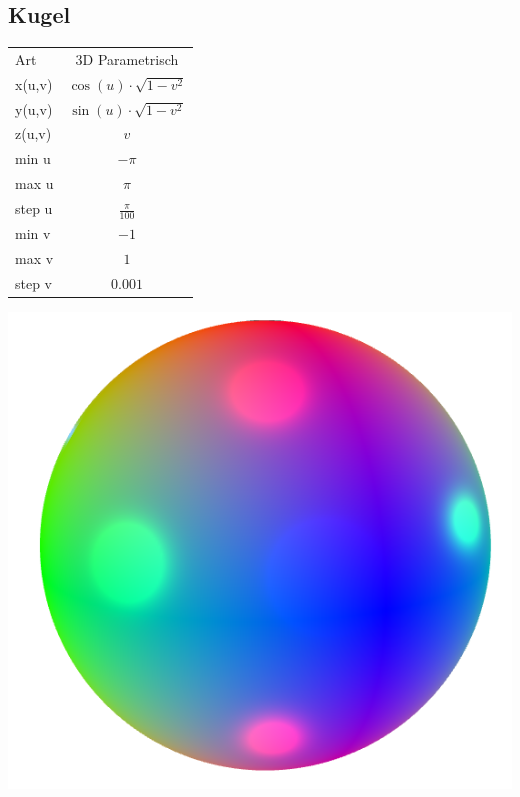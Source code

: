 \documentclass{scrartcl}
\begin{document}
\subsection{Kugel}
\begin{tabular}[b]{|l|c|}
\hline
\rowcolor[gray]{0.5}
Art &  3D Parametrisch \\
\rowcolor[gray]{1}
x(u,v) & \(\cos(u) \cdot \sqrt{1-v^2}\) \\
\rowcolor[gray]{0.5}
y(u,v) & \(\sin(u) \cdot \sqrt{1-v^2}\) \\
\rowcolor[gray]{1}
z(u,v) & \(v\) \\
\rowcolor[gray]{0.5}
min u & \(-\pi\) \\
\rowcolor[gray]{1}
max u & \(\pi\) \\
\rowcolor[gray]{0.5}
step u & \(\frac{\pi}{100}\) \\
\rowcolor[gray]{1}
min v & \(-1\) \\
\rowcolor[gray]{0.5}
max v & \(1\) \\
\rowcolor[gray]{1}
step v &\(0.001\) \\
\hline
\end{tabular}
\includegraphics[height=0.22\textheight]{images/graphs/sphere.png}\\
\end{document}
